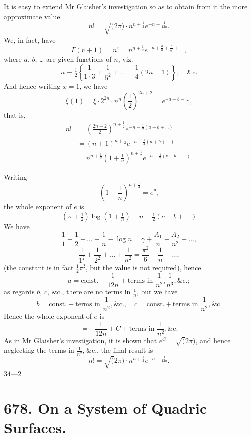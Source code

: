 \documentclass[11pt,a4paper]{book}
\begin{document}
It is easy to extend Mr Glaisher's investigation so as to obtain from it the more approximate value
\[
n! = \surd(2\pi) \cdot n^{n+\frac{1}{2}} e^{-n + \frac{1}{12n}}.
\]
We, in fact, have
\[
\Gamma(n + 1) = n! = n^{n+\frac{1}{2}} e^{-n + \frac{a}{n} + \frac{b}{n^3} + \ldots},
\]
where $a$, $b$, \dots{} are given functions of $n$, viz.
\[
a = \tfrac{1}{2} \left\{\frac{1}{1 \cdot 3} + \frac{1}{5^2} + \ldots - \frac{1}{4}(2n + 1)\right\}, \quad \text{\&c.}
\]
And hence writing $x = 1$, we have
\[
\xi(1) = \xi \cdot 2^{2n} \cdot n^n \left(\frac{1}{2}\right)^{2n+2} = e^{-a - b - \ldots},
\]
that is,
\begin{align*}
n! &= \left(\frac{2n + 2}{2}\right)^{n+\frac{1}{2}} e^{-n - \frac{1}{2}(a + b + \ldots)} \\
&= (n + 1)^{n+\frac{1}{2}} e^{-n - \frac{1}{2}(a + b + \ldots)} \\
&= n^{n+\frac{1}{2}} \left(1 + \frac{1}{n}\right)^{n+\frac{1}{2}} e^{-n - \frac{1}{2}(a + b + \ldots)}.
\end{align*}

Writing
\[
\left(1 + \frac{1}{n}\right)^{n+\frac{1}{2}} = e^{\theta},
\]
the whole exponent of $e$ is
\[
(n + \tfrac{1}{2}) \log(1 + \tfrac{1}{n}) - n - \tfrac{1}{2}(a + b + \ldots)
\]
We have
\[
\frac{1}{1} + \frac{1}{2} + \ldots + \frac{1}{n} - \log n = \gamma + \frac{A_1}{n} + \frac{A_2}{n^2} + \ldots,
\]
\[
\frac{1}{1^2} + \frac{1}{2^2} + \ldots + \frac{1}{n^2} = \frac{\pi^2}{6} - \frac{1}{n} + \ldots,
\]
(the constant is in fact $\frac{1}{2}\pi^2$, but the value is not required), hence
\[
a = \text{const.} - \frac{1}{12n} + \text{terms in } \frac{1}{n^2}, \frac{1}{n^3}, \text{\&c.};
\]
as regards $b$, $c$, \&c., there are no terms in $\frac{1}{n}$, but we have
\[
b = \text{const.} + \text{terms in } \frac{1}{n^2}, \text{\&c.}, \quad c = \text{const.} + \text{terms in } \frac{1}{n^2}, \text{\&c.}
\]
Hence the whole exponent of $e$ is
\[
= -\frac{1}{12n} + C + \text{terms in } \frac{1}{n^2}, \text{\&c.}
\]
As in Mr Glaisher's investigation, it is shown that $e^C = \surd(2\pi)$, and hence neglecting the terms in $\frac{1}{n^2}$, \&c., the final result is
\[
n! = \surd(2\pi) \cdot n^{n+\frac{1}{2}} e^{-n + \frac{1}{12n}}.
\]
\hfill $34\text{---}2$

\newpage

\section*{678. On a System of Quadric Surfaces.}
\end{document}
